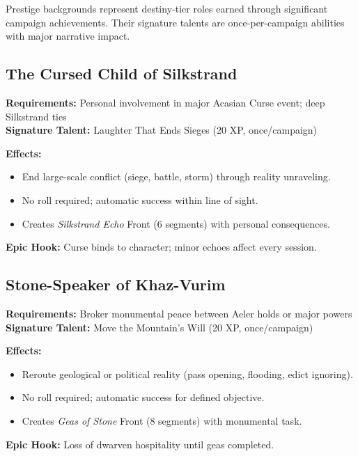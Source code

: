 Prestige backgrounds represent destiny-tier roles earned through significant campaign achievements. Their signature talents are once-per-campaign abilities with major narrative impact.

\subsection{The Cursed Child of Silkstrand}
\label{subsec:cursed-child}

\textbf{Requirements:} Personal involvement in major Acasian Curse event; deep Silkstrand ties\\
\textbf{Signature Talent:} Laughter That Ends Sieges (20 XP, once/campaign)

\textbf{Effects:}
\begin{itemize}
\item End large-scale conflict (siege, battle, storm) through reality unraveling.
\item No roll required; automatic success within line of sight.
\item Creates \emph{Silkstrand Echo} Front (6 segments) with personal consequences.
\end{itemize}

\textbf{Epic Hook:} Curse binds to character; minor echoes affect every session.

\subsection{Stone-Speaker of Khaz-Vurim}
\label{subsec:stone-speaker}

\textbf{Requirements:} Broker monumental peace between Aeler holds or major powers\\
\textbf{Signature Talent:} Move the Mountain's Will (20 XP, once/campaign)

\textbf{Effects:}
\begin{itemize}
\item Reroute geological or political reality (pass opening, flooding, edict ignoring).
\item No roll required; automatic success for defined objective.
\item Creates \emph{Geas of Stone} Front (8 segments) with monumental task.
\end{itemize}

\textbf{Epic Hook:} Loss of dwarven hospitality until geas completed.

